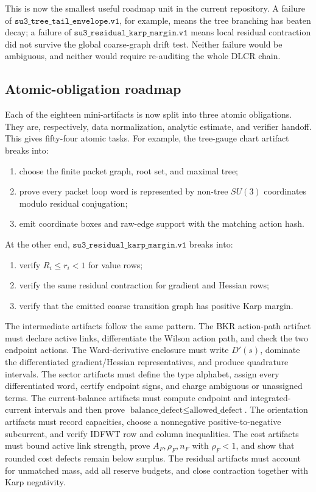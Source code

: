 \endgroup
This is now the smallest useful roadmap unit in the current repository.  A
failure of \(\texttt{su3\_tree\_tail\_envelope.v1}\), for example, means the
tree branching has beaten decay; a failure of
\(\texttt{su3\_residual\_karp\_margin.v1}\) means local residual contraction
did not survive the global coarse-graph drift test.  Neither failure would be
ambiguous, and neither would require re-auditing the whole DLCR chain.

\subsection{Atomic-obligation roadmap}
Each of the eighteen mini-artifacts is now split into three atomic
obligations.  They are, respectively, data normalization, analytic estimate,
and verifier handoff.  This gives fifty-four atomic tasks.  For example, the
tree-gauge chart artifact breaks into:
\begin{enumerate}
\item choose the finite packet graph, root set, and maximal tree;
\item prove every packet loop word is represented by non-tree \(SU(3)\)
  coordinates modulo residual conjugation;
\item emit coordinate boxes and raw-edge support with the matching action hash.
\end{enumerate}
At the other end,
\(\texttt{su3\_residual\_karp\_margin.v1}\) breaks into:
\begin{enumerate}
\item verify \(R_i\le r_i<1\) for value rows;
\item verify the same residual contraction for gradient and Hessian rows;
\item verify that the emitted coarse transition graph has positive Karp
  margin.
\end{enumerate}
The intermediate artifacts follow the same pattern.  The BKR action-path
artifact must declare active links, differentiate the Wilson action path, and
check the two endpoint actions.  The Ward-derivative enclosure must write
\(D'(s)\), dominate the differentiated gradient/Hessian representatives, and
produce quadrature intervals.  The sector artifacts must define the type
alphabet, assign every differentiated word, certify endpoint signs, and charge
ambiguous or unassigned terms.  The current-balance artifacts must compute
endpoint and integrated-current intervals and then prove
\(\text{balance\_defect}\le\text{allowed\_defect}\).  The orientation artifacts
must record capacities, choose a nonnegative positive-to-negative subcurrent,
and verify IDFWT row and column inequalities.  The cost artifacts must bound
active link strength, prove \(A_F,\rho_F,n_F\) with \(\rho_F<1\), and show
that rounded cost defects remain below surplus.  The residual artifacts must
account for unmatched mass, add all reserve budgets, and close contraction
together with Karp negativity.


